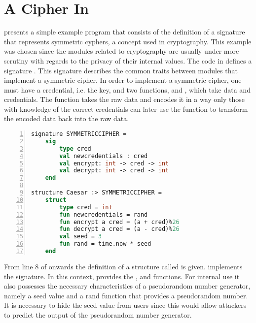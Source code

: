\section{A Cipher In \MiniML}
\label{sec:MLExample}
 presents a simple example program that consists of the definition of a signature that represents symmetric cyphers, a concept used in cryptography.
This example was chosen since the modules related to cryptography are usually under more scrutiny with regards to the privacy of their internal values.
The code in  defines a signature .
This signature describes the common traits between modules that implement a symmetric cipher.
In order to implement a symmetric cipher, one must have a credential, i.e. the key, and two functions,  and , which take data and credentials.
The  function takes the raw data and encodes it in a way only those with knowledge of the correct credentials can later use the  function to transform the encoded data back into the raw data.

\begin{lstlisting}[frame=single, language=ML,numbers=left, label=code:Example, caption=Example of a security sensitive module specifying and implementing a symmetric cypher.]
signature SYMMETRICCIPHER =
    sig 
        type cred
        val newcredentials : cred
        val encrypt: int -> cred -> int
        val decrypt: int -> cred -> int
    end

structure Caesar :> SYMMETRICCIPHER =
    struct
        type cred = int
        fun newcredentials = rand
        fun encrypt a cred = (a + cred)%26
        fun decrypt a cred = (a - cred)%26
        val seed = 3
        fun rand = time.now * seed
    end
\end{lstlisting}

From line 8 of  onwards the definition of a structure called  is given.
 implements the  signature.
In this context,  provides the ,  and  functions.
For internal use it also possesses the necessary characteristics of a pseudorandom number generator, namely a seed value and a rand function that provides a pseudorandom number.
It is necessary to hide the seed value from users since this would allow attackers to predict the output of the pseudorandom number generator.

